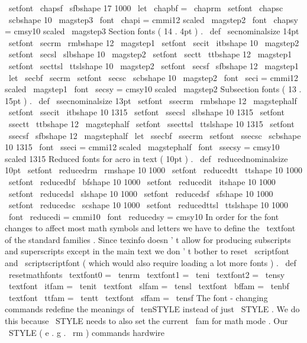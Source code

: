 \
setfont
\
chapsf
\
sfbshape
{
17
}
{
1000
}
\
let
\
chapbf
=
\
chaprm
\
setfont
\
chapsc
\
scbshape
{
10
}
{
\
magstep3
}
\
font
\
chapi
=
cmmi12
scaled
\
magstep2
\
font
\
chapsy
=
cmsy10
scaled
\
magstep3
%
Section
fonts
(
14
.
4pt
)
.
\
def
\
secnominalsize
{
14pt
}
\
setfont
\
secrm
\
rmbshape
{
12
}
{
\
magstep1
}
\
setfont
\
secit
\
itbshape
{
10
}
{
\
magstep2
}
\
setfont
\
secsl
\
slbshape
{
10
}
{
\
magstep2
}
\
setfont
\
sectt
\
ttbshape
{
12
}
{
\
magstep1
}
\
setfont
\
secttsl
\
ttslshape
{
10
}
{
\
magstep2
}
\
setfont
\
secsf
\
sfbshape
{
12
}
{
\
magstep1
}
\
let
\
secbf
\
secrm
\
setfont
\
secsc
\
scbshape
{
10
}
{
\
magstep2
}
\
font
\
seci
=
cmmi12
scaled
\
magstep1
\
font
\
secsy
=
cmsy10
scaled
\
magstep2
%
Subsection
fonts
(
13
.
15pt
)
.
\
def
\
ssecnominalsize
{
13pt
}
\
setfont
\
ssecrm
\
rmbshape
{
12
}
{
\
magstephalf
}
\
setfont
\
ssecit
\
itbshape
{
10
}
{
1315
}
\
setfont
\
ssecsl
\
slbshape
{
10
}
{
1315
}
\
setfont
\
ssectt
\
ttbshape
{
12
}
{
\
magstephalf
}
\
setfont
\
ssecttsl
\
ttslshape
{
10
}
{
1315
}
\
setfont
\
ssecsf
\
sfbshape
{
12
}
{
\
magstephalf
}
\
let
\
ssecbf
\
ssecrm
\
setfont
\
ssecsc
\
scbshape
{
10
}
{
1315
}
\
font
\
sseci
=
cmmi12
scaled
\
magstephalf
\
font
\
ssecsy
=
cmsy10
scaled
1315
%
Reduced
fonts
for
acro
in
text
(
10pt
)
.
\
def
\
reducednominalsize
{
10pt
}
\
setfont
\
reducedrm
\
rmshape
{
10
}
{
1000
}
\
setfont
\
reducedtt
\
ttshape
{
10
}
{
1000
}
\
setfont
\
reducedbf
\
bfshape
{
10
}
{
1000
}
\
setfont
\
reducedit
\
itshape
{
10
}
{
1000
}
\
setfont
\
reducedsl
\
slshape
{
10
}
{
1000
}
\
setfont
\
reducedsf
\
sfshape
{
10
}
{
1000
}
\
setfont
\
reducedsc
\
scshape
{
10
}
{
1000
}
\
setfont
\
reducedttsl
\
ttslshape
{
10
}
{
1000
}
\
font
\
reducedi
=
cmmi10
\
font
\
reducedsy
=
cmsy10
%
In
order
for
the
font
changes
to
affect
most
math
symbols
and
letters
%
we
have
to
define
the
\
textfont
of
the
standard
families
.
Since
%
texinfo
doesn
'
t
allow
for
producing
subscripts
and
superscripts
except
%
in
the
main
text
we
don
'
t
bother
to
reset
\
scriptfont
and
%
\
scriptscriptfont
(
which
would
also
require
loading
a
lot
more
fonts
)
.
%
\
def
\
resetmathfonts
{
%
\
textfont0
=
\
tenrm
\
textfont1
=
\
teni
\
textfont2
=
\
tensy
\
textfont
\
itfam
=
\
tenit
\
textfont
\
slfam
=
\
tensl
\
textfont
\
bffam
=
\
tenbf
\
textfont
\
ttfam
=
\
tentt
\
textfont
\
sffam
=
\
tensf
}
%
The
font
-
changing
commands
redefine
the
meanings
of
\
tenSTYLE
instead
%
of
just
\
STYLE
.
We
do
this
because
\
STYLE
needs
to
also
set
the
%
current
\
fam
for
math
mode
.
Our
\
STYLE
(
e
.
g
.
\
rm
)
commands
hardwire
